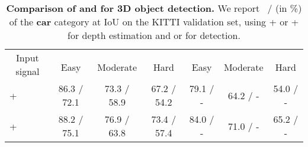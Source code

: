 \begin{table}[!h]
	\centering
	\tabcolsep 2.5pt
	\caption{\textbf{Comparison of \GDC and \PnP for 3D object detection.}  We report \APBEV ~/ \AP (in \%) of the \textbf{car} category at IoU on the KITTI validation set, using \SDN+ \PnP or \SDN+ \GDC for depth estimation and \PRCNN or \vPIXOR for detection.} \label{tbDC}
	\begin{tabular}{l|c|c|c|c|c|c}
		\hline
		\multicolumn{1}{c|}{\multirow{2}{*}{Input signal}} & \multicolumn{3}{c|}{\PRCNN}                                                            & \multicolumn{3}{c}{\vPIXOR} \\ \cline{2-7}
		\multicolumn{1}{c|}{}                                                   & Easy                            & Moderate                        & Hard                             & Easy        & Moderate   & Hard  \\ \hline
		\SDN+ \PnP    & 86.3 / 72.1 & 73.3 / 58.9 & 67.2 / 54.2 & 79.1 / - \hspace{10pt}  & 64.2  / - \hspace{10pt} & 54.0 / - \hspace{10pt}  \\
		\SDN+ \GDC   & 88.2 / 75.1 & 76.9 / 63.8 & 73.4 / 57.4 & 84.0 / - \hspace{10pt}  & 71.0 / - \hspace{10pt} & 65.2 / - \hspace{10pt}  \\
		\hline
	\end{tabular}
\end{table}


